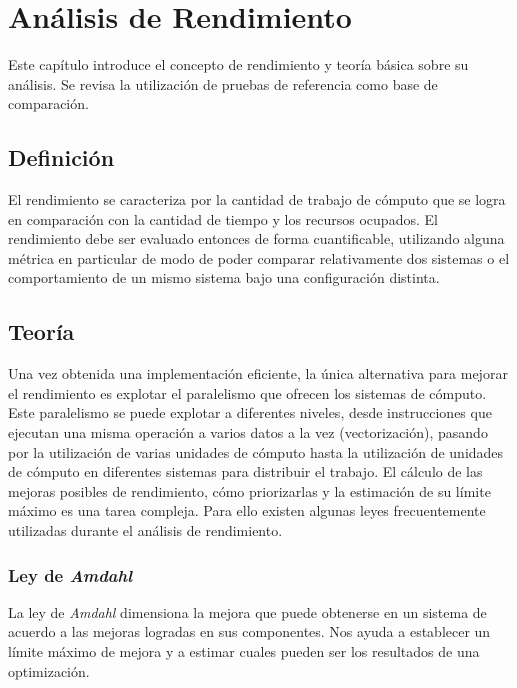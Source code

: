 \documentclass[a4paper]{report}
\begin{document}
\chapter{Análisis de Rendimiento}\label{chapter:analysis}

Este capítulo introduce el concepto de rendimiento y teoría básica sobre su análisis.
Se revisa la utilización de pruebas de referencia como base de comparación.

\section{Definición}

El rendimiento se caracteriza por la cantidad de trabajo de cómputo que se
logra en comparación con la cantidad de tiempo y los recursos ocupados.
El rendimiento debe ser evaluado entonces de forma cuantificable, utilizando alguna
métrica en particular de modo de poder comparar relativamente dos sistemas o
el comportamiento de un mismo sistema bajo una configuración distinta.

\section{Teoría}

Una vez obtenida una implementación eficiente, la única alternativa para mejorar el rendimiento es explotar el paralelismo que
ofrecen los sistemas de cómputo. Este paralelismo se puede explotar a diferentes niveles, desde instrucciones que ejecutan una misma operación a varios
datos a la vez (vectorización), pasando por la utilización de varias unidades de cómputo hasta la utilización de unidades de cómputo en diferentes sistemas para distribuir el trabajo. El cálculo de las mejoras posibles de rendimiento, cómo priorizarlas y la estimación de su límite máximo es una tarea compleja. Para ello existen algunas leyes frecuentemente utilizadas durante el análisis de rendimiento.

\subsection{Ley de {\it Amdahl}}

 La ley de {\it Amdahl} \cite{amdahl} dimensiona la mejora que puede obtenerse en un sistema de acuerdo a las mejoras logradas en sus componentes. Nos ayuda a establecer un límite máximo de mejora y a estimar cuales pueden ser los resultados de una optimización.

\bigskip
\end{document}

